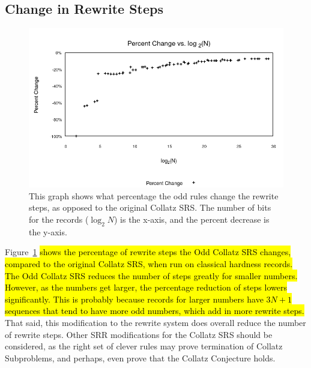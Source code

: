 \subsection{Change in Rewrite Steps}
\begin{figure}
    \centering
    \includegraphics[scale=0.75]{ModAvoidanceAnalysisPics/Percent_Change.png}
    \caption{This graph shows what percentage the odd rules change the rewrite steps, as opposed to the original Collatz SRS. The number of bits for the records ($\log_2{N}$) is the x-axis, and the percent decrease is the y-axis.}
    \label{fig:percent_decrease}
\end{figure}
Figure~\ref{fig:percent_decrease} \hl{shows the percentage of rewrite steps the Odd Collatz SRS changes, compared to the original Collatz SRS, when run on classical hardness records. The Odd Collatz SRS reduces the number of steps greatly for smaller numbers. However, as the numbers get larger, the percentage reduction of steps lowers significantly. This is probably because records for larger numbers have $3N+1$ sequences that tend to have more odd numbers, which add in more rewrite steps.} That said, this modification to the rewrite system does overall reduce the number of rewrite steps. Other SRR modifications for the Collatz SRS should be considered, as the right set of clever rules may prove termination of Collatz Subproblems, and perhaps, even prove that the Collatz Conjecture holds.



